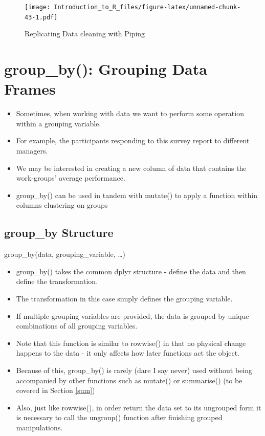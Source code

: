 \documentclass[]{book}
\providecommand{\tightlist}{%
  \setlength{\itemsep}{0pt}\setlength{\parskip}{0pt}}
\theoremstyle{definition}
\theoremstyle{definition}
\theoremstyle{definition}
\theoremstyle{remark}
\begin{document}
\begin{figure}
\centering
\texttt{[image: Introduction\_to\_R\_files/figure-latex/unnamed-chunk-43-1.pdf]}
\caption{\label{fig:unnamed-chunk-43}Replicating Data cleaning with Piping}
\end{figure}

\hypertarget{group}{%
\section{group\_by(): Grouping Data Frames}\label{group}}

\begin{itemize}
\tightlist
\item
  Sometimes, when working with data we want to perform some operation within a grouping variable.
\item
  For example, the participants responding to this survey report to different managers.
\item
  We may be interested in creating a new column of data that contains the work-groups' average performance.
\item
  group\_by() can be used in tandem with mutate() to apply a function within columns clustering on groups
\end{itemize}

\hypertarget{group_by-structure}{%
\subsection{group\_by Structure}\label{group_by-structure}}

group\_by(data, grouping\_variable, \ldots{})

\begin{itemize}
\tightlist
\item
  group\_by() takes the common dplyr structure - define the data and then define the transformation.
\item
  The transformation in this case simply defines the grouping variable.
\item
  If multiple grouping variables are provided, the data is grouped by unique combinations of all grouping variables.
\item
  Note that this function is similar to rowwise() in that no physical change happens to the data - it only affects how later functions act the object.
\item
  Because of this, group\_by() is rarely (dare I say never) used without being accompanied by other functions such as mutate() or summarise() (to be covered in Section \ref{sum})
\item
  Also, just like rowwise(), in order return the data set to its ungrouped form it is necessary to call the ungroup() function after finishing grouped manipulations.
\end{itemize}
\end{document}
